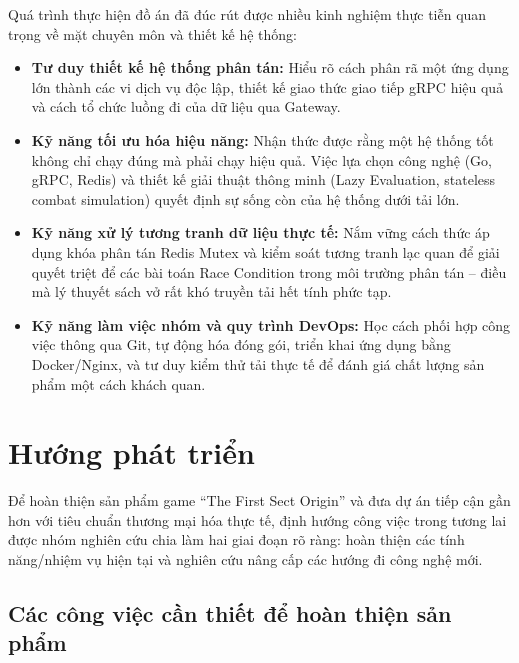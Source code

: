 \documentclass[../Project.tex]{subfiles}
\begin{document}
Quá trình thực hiện đồ án đã đúc rút được nhiều kinh nghiệm thực tiễn quan trọng về mặt chuyên môn và thiết kế hệ thống:
\begin{itemize}
    \item \textbf{Tư duy thiết kế hệ thống phân tán:} Hiểu rõ cách phân rã một ứng dụng lớn thành các vi dịch vụ độc lập, thiết kế giao thức giao tiếp gRPC hiệu quả và cách tổ chức luồng đi của dữ liệu qua Gateway.
    \item \textbf{Kỹ năng tối ưu hóa hiệu năng:} Nhận thức được rằng một hệ thống tốt không chỉ chạy đúng mà phải chạy hiệu quả. Việc lựa chọn công nghệ (Go, gRPC, Redis) và thiết kế giải thuật thông minh (Lazy Evaluation, stateless combat simulation) quyết định sự sống còn của hệ thống dưới tải lớn.
    \item \textbf{Kỹ năng xử lý tương tranh dữ liệu thực tế:} Nắm vững cách thức áp dụng khóa phân tán Redis Mutex và kiểm soát tương tranh lạc quan để giải quyết triệt để các bài toán Race Condition trong môi trường phân tán -- điều mà lý thuyết sách vở rất khó truyền tải hết tính phức tạp.
    \item \textbf{Kỹ năng làm việc nhóm và quy trình DevOps:} Học cách phối hợp công việc thông qua Git, tự động hóa đóng gói, triển khai ứng dụng bằng Docker/Nginx, và tư duy kiểm thử tải thực tế để đánh giá chất lượng sản phẩm một cách khách quan.
\end{itemize}

\section{Hướng phát triển}
\label{sec:future_work}

Để hoàn thiện sản phẩm game ``The First Sect Origin'' và đưa dự án tiếp cận gần hơn với tiêu chuẩn thương mại hóa thực tế, định hướng công việc trong tương lai được nhóm nghiên cứu chia làm hai giai đoạn rõ ràng: hoàn thiện các tính năng/nhiệm vụ hiện tại và nghiên cứu nâng cấp các hướng đi công nghệ mới.

\subsection{Các công việc cần thiết để hoàn thiện sản phẩm}
\label{sec:improve_existing}
\end{document}
